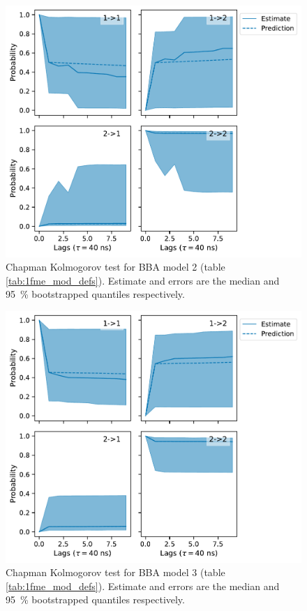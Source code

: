 \documentclass{article}
\begin{document}
\begin{figure}
    \centering
    \includegraphics[height=0.4\textheight]{figures/cktests/bba/m1_logit(dist)_hpix81_cktest.pdf}
    \caption{Chapman Kolmogorov test for BBA model 2 (table \ref{tab:1fme_mod_defs}). Estimate and errors are the median and \SI{95}{\percent} bootstrapped quantiles respectively. }
    \label{fig:cktest_bba_2}
\end{figure}

\begin{figure}
    \centering
    \includegraphics[height=0.4\textheight]{figures/cktests/bba/m1_dist_hpix99_cktest.pdf}
    \caption{Chapman Kolmogorov test for BBA model 3 (table \ref{tab:1fme_mod_defs}). Estimate and errors are the median and \SI{95}{\percent} bootstrapped quantiles respectively.}
    \label{fig:cktest_bba_3}
\end{figure}
\end{document}
